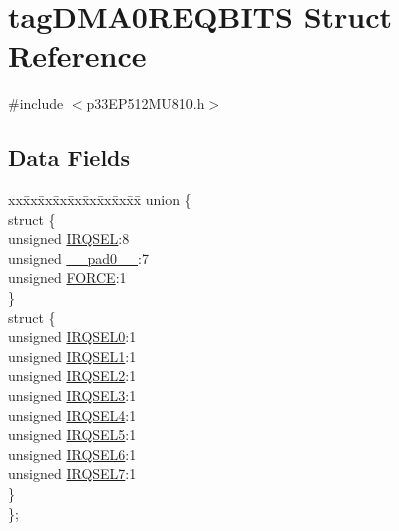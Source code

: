 \hypertarget{structtag_d_m_a0_r_e_q_b_i_t_s}{}\section{tag\+D\+M\+A0\+R\+E\+Q\+B\+I\+TS Struct Reference}
\label{structtag_d_m_a0_r_e_q_b_i_t_s}


{\ttfamily \#include $<$p33\+E\+P512\+M\+U810.\+h$>$}

\subsection*{Data Fields}
\begin{DoxyCompactItemize}
\item 
\begin{tabbing}
xx\=xx\=xx\=xx\=xx\=xx\=xx\=xx\=xx\=\kill
union \{\\
\>struct \{\\
\>\>unsigned \hyperlink{structtag_d_m_a0_r_e_q_b_i_t_s_a5e70ba01366ab2f37371d52661dd93b2}{IRQSEL}:8\\
\>\>unsigned \hyperlink{structtag_d_m_a0_r_e_q_b_i_t_s_adf71f3d8410c1f1dbbc96680a92c49af}{\_\_pad0\_\_}:7\\
\>\>unsigned \hyperlink{structtag_d_m_a0_r_e_q_b_i_t_s_a9b378a7ffc1ab4bc4a3710fb36389180}{FORCE}:1\\
\>\} \\
\>struct \{\\
\>\>unsigned \hyperlink{structtag_d_m_a0_r_e_q_b_i_t_s_ac73241b8f783760c9192dfd8a0773cad}{IRQSEL0}:1\\
\>\>unsigned \hyperlink{structtag_d_m_a0_r_e_q_b_i_t_s_a45e1f083e5a8a59f25acc35910732426}{IRQSEL1}:1\\
\>\>unsigned \hyperlink{structtag_d_m_a0_r_e_q_b_i_t_s_a60dda7474727b3624ca25fa0067a8924}{IRQSEL2}:1\\
\>\>unsigned \hyperlink{structtag_d_m_a0_r_e_q_b_i_t_s_aeaafe1b8c89398ed382054ab628aed78}{IRQSEL3}:1\\
\>\>unsigned \hyperlink{structtag_d_m_a0_r_e_q_b_i_t_s_a91c4162e0f3d4ac7adcdb49302f19840}{IRQSEL4}:1\\
\>\>unsigned \hyperlink{structtag_d_m_a0_r_e_q_b_i_t_s_a6382d50430464cf20b3dee3dbf2e8c01}{IRQSEL5}:1\\
\>\>unsigned \hyperlink{structtag_d_m_a0_r_e_q_b_i_t_s_ace52408ef8c29561f3c56a3fbcbc8217}{IRQSEL6}:1\\
\>\>unsigned \hyperlink{structtag_d_m_a0_r_e_q_b_i_t_s_acce7dedecdf1f53cdbead3edf7c5d53a}{IRQSEL7}:1\\
\>\} \\
\}; \\

\end{tabbing}\end{DoxyCompactItemize}


